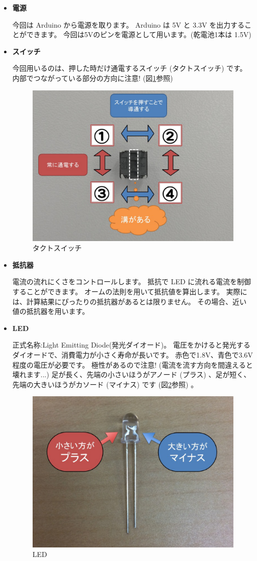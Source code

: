 \documentclass[11pt,a4paper]{jarticle}
\begin{document}
\begin{itemize}
 \item \textbf{電源}
       
       今回は Arduino から電源を取ります。
       Arduino は 5V と 3.3V を出力することができます。
       今回は5Vのピンを電源として用います。(乾電池1本は 1.5V)

 \item \textbf{スイッチ}

       今回用いるのは、押した時だけ通電するスイッチ (タクトスイッチ) です。
       内部でつながっている部分の方向に注意! (図\ref{figure:tact_switch}参照) 
       
\begin{figure}[htb]
 \centering
  \includegraphics[width=0.55\columnwidth]{tact_switch.eps}
  \caption{タクトスイッチ}
  \label{figure:tact_switch}
\end{figure}

 \item \textbf{抵抗器}

       電流の流れにくさをコントロールします。
       抵抗で LED に流れる電流を制御することができます。
       オームの法則を用いて抵抗値を算出します。
       実際には、計算結果にぴったりの抵抗器があるとは限りません。
       その場合、近い値の抵抗器を用います。

 \item \textbf{LED}

       正式名称:Light Emitting Diode(発光ダイオード)。
       電圧をかけると発光するダイオードで、消費電力が小さく寿命が長いです。
       赤色で1.8V、青色で3.6V程度の電圧が必要です。
       極性があるので注意! (電流を流す方向を間違えると壊れます...)
       足が長く、先端の小さいほうがアノード (プラス) 、足が短く、先端の大きいほうがカソード (マイナス) です (図\ref{figure:LED}参照) 。
       
\begin{figure}[htb]
  \centering
  \includegraphics[width=0.55\columnwidth]{LED.eps}
  \caption{LED}
  \label{figure:LED}
\end{figure}
       

\end{itemize}
\end{document}
